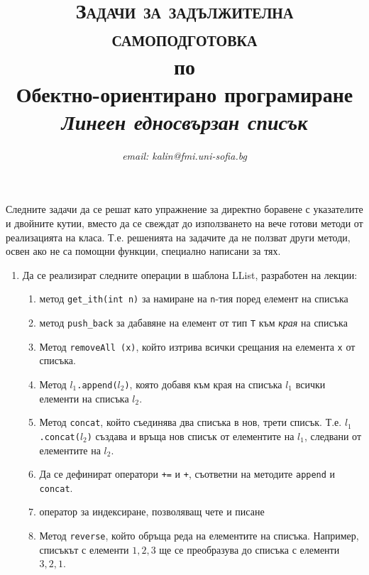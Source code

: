 \documentclass[12pt,a4paper]{article}
\author{\textit{email: kalin@fmi.uni-sofia.bg}}
\title{\textsc{Задачи за задължителна самоподготовка} \\
по \\
Обектно-ориентирано програмиране\\
\textit{Линеен едносвързан списък}}
\newcommand{\code}[1]{\texttt{#1}}
\begin{document}
\maketitle

Следните задачи да се решат като упражнение за директно боравене с указателите и двойните кутии, вместо да се свеждат до използването на вече готови методи от реализацията на класа. Т.е. решенията на задачите да не ползват други методи, освен ако не са помощни функции, специално написани за тях.

\begin{enumerate}

	\item Да се реализират следните операции в шаблона LList, разработен на лекции:

	\begin{enumerate}
		\item метод \code{get\_ith(int n)} за намиране на \code{n}-тия поред елемент на списъка
		\item метод \code{push\_back} за дабавяне на елемент от тип \code{T} към \textit{края} на списъка
		\item Метод \code{removeAll (x)}, който изтрива всички срещания на елемента \code{x} от списъка.
		\item Метод \code{$l_1$.append($l_2$)}, която добавя към края на списъка $l_1$ всички елементи на списъка $l_2$.
		\item Метод \code{concat}, който съединява два списъка в нов, трети списък. Т.е. \code{$l_1$.concat($l_2$)} създава и връща нов списък от елементите на \code{$l_1$}, следвани от елементите на \code{$l_2$}.
		\item Да се дефинират оператори \code{+=} и \code{+}, съответни на методите \code{append} и \code{concat}.
		\item оператор за индексиране, позволяващ чете и писане
		\item Метод \code{reverse}, който обръща реда на елементите на списъка. Например, списъкът с елементи $1,2,3$ ще се преобразува до списъка с елементи $3,2,1$.
	\end{enumerate}
\end{enumerate}


	\vspace{20px}
\end{document}
